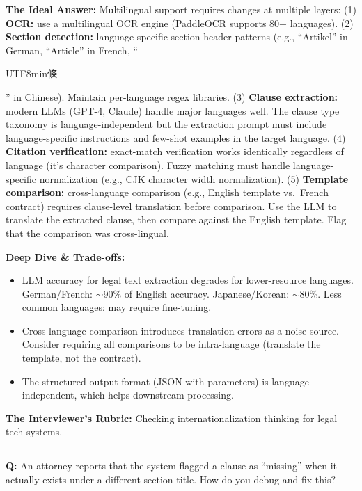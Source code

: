 \textbf{The Ideal Answer:} Multilingual support requires changes at multiple layers: (1) \textbf{OCR:} use a multilingual OCR engine (PaddleOCR supports 80+ languages). (2) \textbf{Section detection:} language-specific section header patterns (e.g., ``Artikel'' in German, ``Article'' in French, ``\begin{CJK}{UTF8}{min}條\end{CJK}'' in Chinese). Maintain per-language regex libraries. (3) \textbf{Clause extraction:} modern LLMs (GPT-4, Claude) handle major languages well. The clause type taxonomy is language-independent but the extraction prompt must include language-specific instructions and few-shot examples in the target language. (4) \textbf{Citation verification:} exact-match verification works identically regardless of language (it's character comparison). Fuzzy matching must handle language-specific normalization (e.g., CJK character width normalization). (5) \textbf{Template comparison:} cross-language comparison (e.g., English template vs.\ French contract) requires clause-level translation before comparison. Use the LLM to translate the extracted clause, then compare against the English template. Flag that the comparison was cross-lingual.

\textbf{Deep Dive \& Trade-offs:}
\begin{itemize}
  \item LLM accuracy for legal text extraction degrades for lower-resource languages. German/French: $\sim$90\% of English accuracy. Japanese/Korean: $\sim$80\%. Less common languages: may require fine-tuning.
  \item Cross-language comparison introduces translation errors as a noise source. Consider requiring all comparisons to be intra-language (translate the template, not the contract).
  \item The structured output format (JSON with parameters) is language-independent, which helps downstream processing.
\end{itemize}

\textbf{The Interviewer's Rubric:} Checking internationalization thinking for legal tech systems.

\bigskip\hrule\bigskip

\textbf{Q:} An attorney reports that the system flagged a clause as ``missing'' when it actually exists under a different section title. How do you debug and fix this?

